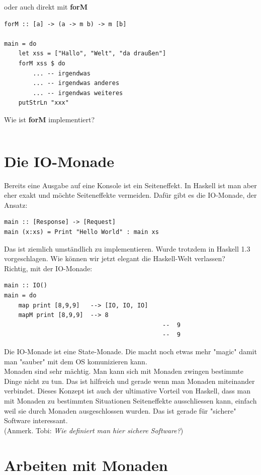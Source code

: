 \documentclass[ngerman,a4paper]{report}
\begin{document}
oder auch direkt mit \textbf{forM}

\begin{lstlisting}
forM :: [a] -> (a -> m b) -> m [b]

main = do
	let xss = ["Hallo", "Welt", "da draußen"]
	forM xss $ do
		...	-- irgendwas
		...	-- irgendwas anderes
		...	-- irgendwas weiteres
	putStrLn "xxx"
\end{lstlisting}

Wie ist \textbf{forM} implementiert?

\begin{lstlisting}

\end{lstlisting}

\section{Die IO-Monade}
Bereits eine Ausgabe auf eine Konsole ist ein Seiteneffekt. In Haskell ist man aber eher exakt und möchte Seiteneffekte vermeiden. Dafür gibt es die IO-Monade, der Ansatz:
\begin{lstlisting}
main :: [Response] -> [Request]
main (x:xs) = Print "Hello World" : main xs
\end{lstlisting}
Das ist ziemlich umständlich zu implementieren. Wurde trotzdem in Haskell 1.3 vorgeschlagen. Wie können wir jetzt elegant die Haskell-Welt verlassen?\\ Richtig, mit der IO-Monade:
\begin{lstlisting}
main :: IO()
main = do
	map print [8,9,9] 	--> [IO, IO, IO]
	mapM print [8,9,9] 	-->	8
											--	9
											--	9
\end{lstlisting}
Die IO-Monade ist eine State-Monade. Die macht noch etwas mehr "magic" damit man "sauber" mit dem OS komunizieren kann.\\
Monaden sind sehr mächtig. Man kann sich mit Monaden zwingen bestimmte Dinge nicht zu tun. Das ist hilfreich und gerade wenn man Monaden miteinander verbindet. Dieses Konzept ist auch der ultimative Vorteil von Haskell, dass man mit Monaden zu bestimmten Situationen Seiteneffekte ausschliessen kann, einfach weil sie durch Monaden ausgeschlossen wurden. Das ist gerade für "sichere" Software interessant.\\ (Anmerk. Tobi: \emph{Wie definiert man hier sichere Software?})
\newpage
\section{Arbeiten mit Monaden}
\end{document}
